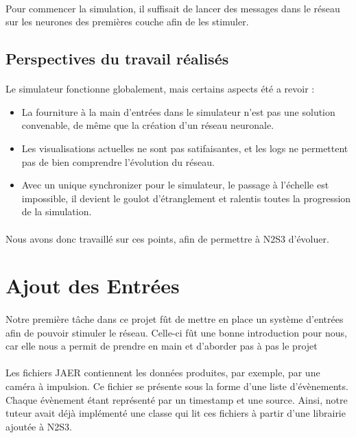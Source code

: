 \documentclass[a4paper,10pt]{article}
\begin{document}
\paragraph{}
Pour commencer la simulation, il suffisait de lancer des messages dans le réseau sur les neurones des premières couche afin de les stimuler.

\subsection{Perspectives du travail réalisés}
\paragraph{}
Le simulateur fonctionne globalement, mais certains aspects été a revoir :
\begin{itemize}
\item{La fourniture à la main d’entrées dans le simulateur n’est pas une solution convenable, de même que la création d’un réseau neuronale.}
\item{Les visualisations actuelles ne sont pas satifaisantes, et les logs ne permettent pas de bien comprendre l’évolution du réseau.}
\item{Avec un unique synchronizer pour le simulateur, le passage à l’échelle est impossible, il devient le goulot d’étranglement et ralentis toutes la progression de la simulation.}
\end{itemize}

\paragraph{}
Nous avons donc travaillé sur ces points, afin de permettre à N2S3 d’évoluer.

\newpage

\section{Ajout des Entrées}

\paragraph{}
Notre première tâche dans ce projet fût de mettre en place un système d'entrées afin de pouvoir stimuler le réseau. Celle-ci fût une bonne introduction pour nous, car elle nous a permit de prendre en main et d’aborder pas à pas le projet

\paragraph{}
Les fichiers JAER contiennent les données produites, par exemple, par une caméra à impulsion. Ce fichier se présente sous la forme d’une liste d'évènements. Chaque évènement étant représenté par un timestamp et une source. Ainsi, notre tuteur avait déjà implémenté une classe qui lit ces fichiers à partir d’une librairie ajoutée à N2S3. 
\end{document}
